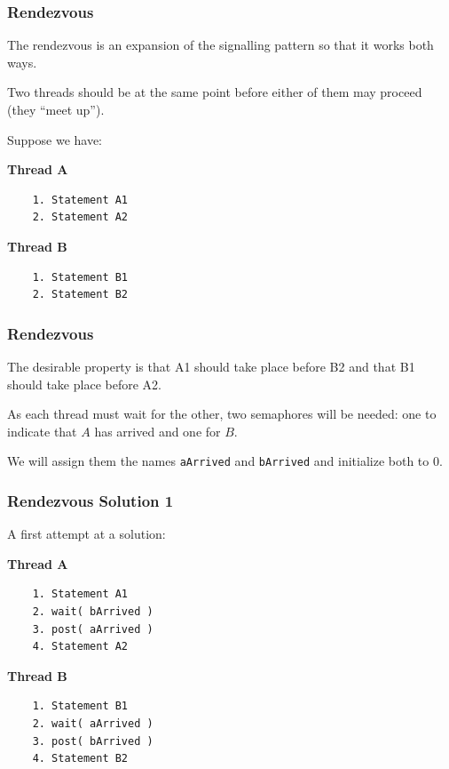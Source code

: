 \begin{frame}[fragile]
	\frametitle{Rendezvous}

	The rendezvous is an expansion of the signalling pattern so that it works both ways.

	Two threads should be at the same point before either of them may proceed (they ``meet up'').

	Suppose we have:

	\begin{multicols}{2}
		\textbf{Thread A}
		\begin{verbatim}
	1. Statement A1
	2. Statement A2
  \end{verbatim}
		\columnbreak
		\textbf{Thread B}
		\begin{verbatim}
	1. Statement B1
	2. Statement B2
  \end{verbatim}
	\end{multicols}
	\vspace{-2em}



\end{frame}

\begin{frame}
	\frametitle{Rendezvous}

	The desirable property is that A1 should take place before B2 and that B1 should take place before A2.

	As each thread must wait for the other, two semaphores will be needed: one to indicate that $A$ has arrived and one for $B$.

	We will assign them the names \texttt{aArrived} and \texttt{bArrived} and initialize both to 0.

\end{frame}

\begin{frame}[fragile]
	\frametitle{Rendezvous Solution 1}

	A first attempt at a solution:

	\begin{multicols}{2}
		\textbf{Thread A}
		\begin{verbatim}
	1. Statement A1
	2. wait( bArrived )
	3. post( aArrived )
	4. Statement A2
  \end{verbatim}
		\columnbreak
		\textbf{Thread B}
		\begin{verbatim}
	1. Statement B1
	2. wait( aArrived )
	3. post( bArrived )
	4. Statement B2
  \end{verbatim}
	\end{multicols}
	\vspace{-2em}


\end{frame}

